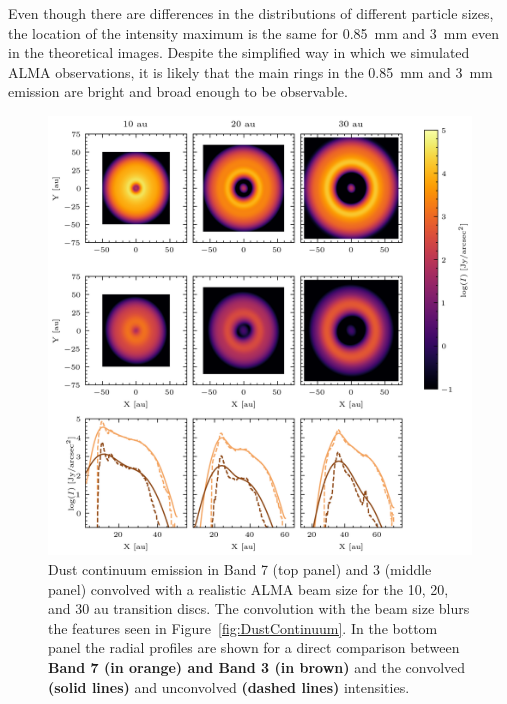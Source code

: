 \documentclass[fleqn,usenatbib]{mnras}
\begin{document}
        Even though there are differences in the distributions of different particle sizes, the location of the intensity maximum is the same for \SI{0.85}{mm} and \SI{3}{mm} even in the theoretical images. 
        Despite the simplified way in which we simulated ALMA observations, 
        it is likely that the main rings in the \SI{0.85}{mm} and \SI{3}{mm} emission are bright and broad enough to be observable.
        
        \begin{figure}
          \centering
          \includegraphics[width=\textwidth]{Fig5}
          \caption{Dust continuum emission in Band 7 (top panel) and 3 (middle panel) convolved with a realistic ALMA beam size for the 10, 20, and 30 au transition discs. The convolution with the beam size blurs the features seen in Figure~\ref{fig:DustContinuum}. In the bottom panel the radial profiles are shown for a direct comparison between \textbf{Band 7 (in orange) and Band 3 (in brown)} and the convolved \textbf{(solid lines)} and unconvolved \textbf{(dashed lines)} intensities.}
          \label{fig:comp_beam}
        \end{figure}
\end{document}
